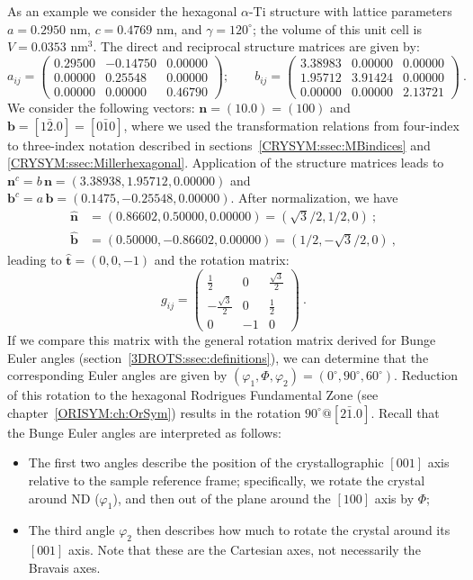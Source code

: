 As an example we consider the hexagonal $\alpha$-Ti structure with lattice parameters $a=0.2950$ nm, $c=0.4769$ nm, and $\gamma=120^{\circ}$; the volume of this unit cell is $V=0.0353$ nm$^3$.  The direct and reciprocal structure matrices are given by:
\[
	a_{ij}=\begin{pmatrix}
	0.29500&-0.14750&0.00000\\
	0.00000&0.25548&0.00000\\
	0.00000&0.00000&0.46790
	\end{pmatrix};\qquad b_{ij} = \begin{pmatrix}
	3.38983&0.00000&0.00000\\
	1.95712&3.91424&0.00000\\
	0.00000&0.00000&2.13721
	\end{pmatrix}\ .
\]
We consider the following vectors: $\mathbf{n}=(10.0)=(100)$ and $\mathbf{b}=[1\bar{2}.0]=[0\bar{1}0]$, where we used the transformation relations from four-index to three-index notation described in sections~\ref{CRYSYM:ssec:MBindices} and \ref{CRYSYM:ssec:Millerhexagonal}.   Application of the structure matrices leads to $\mathbf{n}^c=b\,\mathbf{n} = (3.38938,1.95712,0.00000)$ and $\mathbf{b}^c=a\,\mathbf{b}=(0.1475,-0.25548,0.00000)$.  After normalization, we have 
\begin{equation*}
\begin{split}
	\hat{\mathbf{n}}&=(0.86602,0.50000,0.00000)=(\sqrt{3}/2,1/2,0)\ ;\\ 
	\hat{\mathbf{b}}&=(0.50000,-0.86602,0.00000)=(1/2,-\sqrt{3}/2,0)\ ,
	\end{split}
\end{equation*} 
leading to $\hat{\mathbf{t}}=(0,0,-1)$ and the rotation matrix:
\[
	g_{ij} = \begin{pmatrix}
	\frac{1}{2} & 0 & \frac{\sqrt{3}}{2}\\
	-\frac{\sqrt{3}}{2} & 0 & \frac{1}{2}\\
	0 & -1 & 0
	\end{pmatrix}\ .
\]
If we compare this matrix with the general rotation matrix derived for Bunge Euler angles (section~\ref{3DROTS:ssec:definitions}), we can determine that the corresponding Euler angles are given by $(\varphi_1,\Phi,\varphi_2)=(0^{\circ},90^{\circ},60^{\circ})$.  Reduction of this rotation to the hexagonal Rodrigues Fundamental Zone (see chapter~\ref{ORISYM:ch:OrSym}) results in the rotation $90^{\circ}@[2\bar{1}.0]$.  Recall that the Bunge Euler angles are interpreted as follows:
\begin{itemize}
	\item The first two angles describe the position of the crystallographic $[001]$ axis relative to the sample reference frame; specifically, we rotate the crystal around ND ($\varphi_1$), and then out of the plane around the $[100]$ axis by $\Phi$;
	\item The third angle $\varphi_2$ then describes how much to rotate the crystal around its $[001]$ axis.  Note that these are the Cartesian axes, not necessarily the Bravais axes.
\end{itemize}

